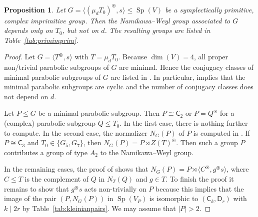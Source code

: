 \documentclass[a4paper]{amsart}
\theoremstyle{plain}
\newtheorem{proposition}[theorem]{Proposition}
\theoremstyle{definition}
\theoremstyle{remark}
\DeclareMathOperator{\Sp}{Sp}
\begin{document}
\begin{proposition}
  \label{prop:primimprim}
  Let \(G = \langle (\mu_d T_0)^\circledast, s\rangle\leqslant\Sp(V)\) be a symplectically primitive, complex imprimitive group.
  Then the Namikawa--Weyl group associated to \(G\) depends only on \(T_0\), but not on \(d\).
  The resulting groups are listed in Table~\ref{tab:primimprim}.
\end{proposition}
\begin{proof}
  Let \(G = \langle T^\circledast, s\rangle\) with \(T = \mu_d T_0\).
  Because \(\dim(V) = 4\), all proper non\-/trivial parabolic subgroups of \(G\) are minimal.
  Hence the conjugacy classes of minimal parabolic subgroups of \(G\) are listed in \cite[Table~3]{RS26}.
  In particular, \cite[Table~3]{RS26} implies that the minimal parabolic subgroups are cyclic and the number of conjugacy classes does not depend on \(d\).

  Let \(P\leqslant G\) be a minimal parabolic subgroup.
  Then \(P \cong \mathsf C_2\) or \(P = Q^\circledast\) for a (complex) parabolic subgroup \(Q\leqslant T_0\).
  In the first case, there is nothing further to compute. 
  In the second case, the normalizer \(N_G(P)\) of \(P\) is computed in \cite[Prop.~4.12]{RS26}.
  If \(P \cong \mathsf C_3\) and \(T_0\in \{G_5, G_7\}\), then \(N_G(P) = P\rtimes Z(T)^\circledast\).
  Then such a group \(P\) contributes a group of type \(A_2\) to the Namikawa--Weyl group.

  In the remaining cases, the proof of \cite[Prop.~4.12]{RS26} shows that \(N_G(P) = P\rtimes \langle C^\circledast, g^\circledast s\rangle\), where \(C\leqslant T\) is the complement of \(Q\) in \(N_T(Q)\) and \(g\in T\).
  To finish the proof it remains to show that \(g^\circledast s\) acts non-trivially on \(P\) because this implies that the image of the pair \((P, N_G(P))\) in $\Sp(V_P)$ is isomorphic to \((\mathsf C_k, \mathsf D_r)\) with \(k \mid 2r\) by Table~\ref{tab:kleinianpairs}.
  We may assume that \(|{P}| > 2\).


\end{proof}
\end{document}
